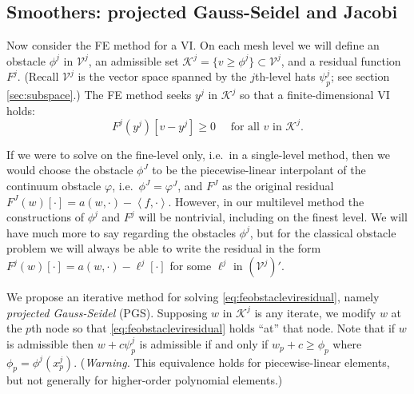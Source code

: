 \documentclass[letterpaper,final,12pt,reqno]{amsart}
\theoremstyle{claim}
\newcommand{\ip}[2]{\left<#1,#2\right>}
\numberwithin{equation}{section}
\numberwithin{figure}{section}
\numberwithin{table}{section}
\numberwithin{theorem}{section}
\begin{document}
\subsection*{Smoothers: projected Gauss-Seidel and Jacobi}  Now consider the FE method for a VI.  On each mesh level we will define an obstacle $\phi^j$ in $\mathcal{V}^j$, an admissible set $\mathcal{K}^j = \{v \ge \phi^j\} \subset \mathcal{V}^j$, and a residual function $F^j$.  (Recall $\mathcal{V}^j$ is the vector space spanned by the $j$th-level hats $\psi_p^j$; see section \ref{sec:subspace}.)  The FE method seeks $y^j$ in $\mathcal{K}^j$ so that a finite-dimensional VI holds:
\begin{equation}
  F^j(y^j)[v-y^j] \ge 0 \quad \text{ for all } v \text{ in } \mathcal{K}^j. \label{eq:feobstacleviresidual}
\end{equation}

If we were to solve on the fine-level only, i.e.~in a single-level method, then we would choose the obstacle $\phi^J$ to be the piecewise-linear interpolant of the continuum obstacle $\varphi$, i.e.~$\phi^J=\varphi^J$, and $F^J$ as the original residual $F^J(w)[\cdot] = a(w,\cdot) - \ip{f}{\cdot}$.  However, in our multilevel method the constructions of $\phi^j$ and $F^j$ will be nontrivial, including on the finest level.  We will have much more to say regarding the obstacles $\phi^j$, but for the classical obstacle problem we will always be able to write the residual in the form $F^j(w)[\cdot] = a(w,\cdot) - \ell^j[\cdot]$ for some $\ell^j$ in $(\mathcal{V}^j)'$.

We propose an iterative method for solving \eqref{eq:feobstacleviresidual}, namely \emph{projected Gauss-Seidel} (PGS).  Supposing $w$ in $\mathcal{K}^j$ is any iterate, we modify $w$ at the $p$th node so that \eqref{eq:feobstacleviresidual} holds ``at'' that node.  Note that if $w$ is admissible then $w+c\psi_p^j$ is admissible if and only if $w_p + c \ge \phi_p$ where $\phi_p = \phi^j(x_p^j)$.  (\emph{Warning.}  This equivalence holds for piecewise-linear elements, but not generally for higher-order polynomial elements.)
\end{document}
